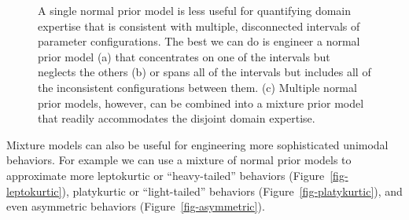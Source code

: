 \documentclass[
  letterpaper,
  DIV=11,
  numbers=noendperiod]{scrartcl}
\begin{document}
\begin{figure}
\begin{minipage}{0.33\linewidth}
\end{minipage}%
%
\begin{minipage}{0.33\linewidth}


\subcaption{\label{fig-multimodal-good}}

\end{minipage}%

\caption{\label{fig-mixture-priors-multimodal}A single normal prior
model is less useful for quantifying domain expertise that is consistent
with multiple, disconnected intervals of parameter configurations. The
best we can do is engineer a normal prior model (a) that concentrates on
one of the intervals but neglects the others (b) or spans all of the
intervals but includes all of the inconsistent configurations between
them. (c) Multiple normal prior models, however, can be combined into a
mixture prior model that readily accommodates the disjoint domain
expertise.}

\end{figure}%

Mixture models can also be useful for engineering more sophisticated
unimodal behaviors. For example we can use a mixture of normal prior
models to approximate more leptokurtic or ``heavy-tailed'' behaviors
(Figure~\ref{fig-leptokurtic}), platykurtic or ``light-tailed''
behaviors (Figure~\ref{fig-platykurtic}), and even asymmetric behaviors
(Figure~\ref{fig-asymmetric}).
\end{document}
